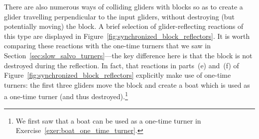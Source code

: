 There are also numerous ways of colliding gliders with blocks so as to create a glider travelling perpendicular to the input gliders, without destroying (but potentially moving) the block. A brief selection of glider-reflecting reactions of this type are displayed in Figure~\ref{fig:synchronized_block_reflectors}. It is worth comparing these reactions with the one-time turners that we saw in Section~\ref{sec:slow_salvo_turners}---the key difference here is that the block is not destroyed during the reflection. In fact, that reactions in parts~(e) and~(f) of Figure~\ref{fig:synchronized_block_reflectors} explicitly make use of one-time turners: the first three gliders move the block and create a boat which is used as a one-time turner (and thus destroyed).\footnote{We first saw that a boat can be used as a one-time turner in Exercise~\ref{exer:boat_one_time_turner}.}

